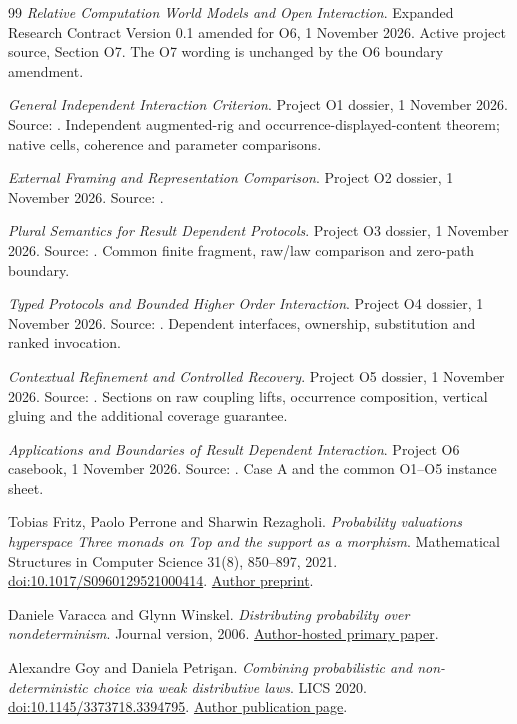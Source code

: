 \documentclass[11pt,a4paper]{article}
\theoremstyle{definition}
\begin{document}
\begin{thebibliography}{99}
\emph{Relative Computation World Models and Open Interaction}.
Expanded Research Contract Version 0.1 amended for O6, 1 November 2026.
Active project source, Section O7. The O7 wording is unchanged by the O6
boundary amendment.

\emph{General Independent Interaction Criterion}.
Project O1 dossier, 1 November 2026.
Source: .
Independent augmented-rig and occurrence-displayed-content theorem;
native cells, coherence and parameter comparisons.

\emph{External Framing and Representation Comparison}.
Project O2 dossier, 1 November 2026.
Source: .

\emph{Plural Semantics for Result Dependent Protocols}.
Project O3 dossier, 1 November 2026.
Source: .
Common finite fragment, raw/law comparison and zero-path boundary.

\emph{Typed Protocols and Bounded Higher Order Interaction}.
Project O4 dossier, 1 November 2026.
Source: .
Dependent interfaces, ownership, substitution and ranked invocation.

\emph{Contextual Refinement and Controlled Recovery}.
Project O5 dossier, 1 November 2026.
Source: .
Sections on raw coupling lifts, occurrence composition, vertical gluing
and the additional coverage guarantee.

\emph{Applications and Boundaries of Result Dependent Interaction}.
Project O6 casebook, 1 November 2026.
Source: .
Case A and the common O1--O5 instance sheet.

Tobias Fritz, Paolo Perrone and Sharwin Rezagholi.
\emph{Probability valuations hyperspace Three monads on Top and the
support as a morphism}.
Mathematical Structures in Computer Science 31(8), 850--897, 2021.
\href{https://doi.org/10.1017/S0960129521000414}{doi:10.1017/S0960129521000414}.
\href{https://arxiv.org/abs/1910.03752}{Author preprint}.

Daniele Varacca and Glynn Winskel.
\emph{Distributing probability over nondeterminism}.
Journal version, 2006.
\href{https://www.cl.cam.ac.uk/~gw104/distprobnd_journal.pdf}{Author-hosted primary paper}.

Alexandre Goy and Daniela Petri\c{s}an.
\emph{Combining probabilistic and non-deterministic choice via weak
distributive laws}.
LICS 2020.
\href{https://doi.org/10.1145/3373718.3394795}{doi:10.1145/3373718.3394795}.
\href{https://agoy.fr/publication/goypetr-dp/}{Author publication page}.
\end{thebibliography}
\end{document}
